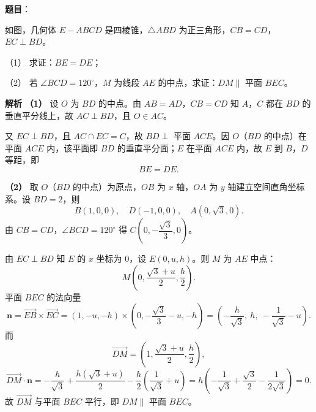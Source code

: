 \begin{answer}

\textbf{题目}：

如图，几何体 $E-ABCD$ 是四棱锥，$\triangle ABD$ 为正三角形，$CB=CD$，$EC\perp BD$。

（1） 求证：$BE=DE$；

（2） 若 $\angle BCD=120^\circ$，$M$ 为线段 $AE$ 的中点，求证：$DM\parallel$ 平面 $BEC$。
\nopagebreak[4]
\begin{center}\end{center}
\nopagebreak[4]
\textbf{解析}
\textbf{（1）} 设 $O$ 为 $BD$ 的中点。由 $AB=AD$，$CB=CD$ 知 $A$，$C$ 都在 $BD$ 的垂直平分线上，故 $AC\perp BD$，且 $O\in AC$。

又 $EC\perp BD$，且 $AC\cap EC=C$，故 $BD\perp$ 平面 $ACE$。因 $O$（$BD$ 的中点）在平面 $ACE$ 内，该平面即 $BD$ 的垂直平分面；$E$ 在平面 $ACE$ 内，故 $E$ 到 $B$，$D$ 等距，即
\nopagebreak[4]
\[BE=DE.\]

\textbf{（2）} 取 $O$（$BD$ 的中点）为原点，$OB$ 为 $x$ 轴，$OA$ 为 $y$ 轴建立空间直角坐标系。设 $BD=2$，则
\nopagebreak[4]
\[B(1,0,0),\quad D(-1,0,0),\quad A(0,\sqrt3,0).\]
由 $CB=CD$，$\angle BCD=120^\circ$ 得 $C\left(0,-\dfrac{\sqrt3}3,0\right)$。

由 $EC\perp BD$ 知 $E$ 的 $x$ 坐标为 $0$，设 $E(0,u,h)$。则 $M$ 为 $AE$ 中点：
\nopagebreak[4]
\[M\left(0,\frac{\sqrt3+u}2,\frac h2\right).\]
平面 $BEC$ 的法向量
\nopagebreak[4]
\[\boldsymbol n=\overrightarrow{EB}\times\overrightarrow{EC}=(1,-u,-h)\times\left(0,-\frac{\sqrt3}3-u,-h\right)=\left(-\frac h{\sqrt3},\ h,\ -\frac1{\sqrt3}-u\right).\]
而
\nopagebreak[4]
\[\overrightarrow{DM}=\left(1,\frac{\sqrt3+u}2,\frac h2\right),\]
\nopagebreak[4]
\[\overrightarrow{DM}\cdot\boldsymbol n=-\frac h{\sqrt3}+\frac{h(\sqrt3+u)}2-\frac h2\left(\frac1{\sqrt3}+u\right)=h\left(-\frac1{\sqrt3}+\frac{\sqrt3}2-\frac1{2\sqrt3}\right)=0.\]
故 $\overrightarrow{DM}$ 与平面 $BEC$ 平行，即 $DM\parallel$ 平面 $BEC$。



\end{answer}
